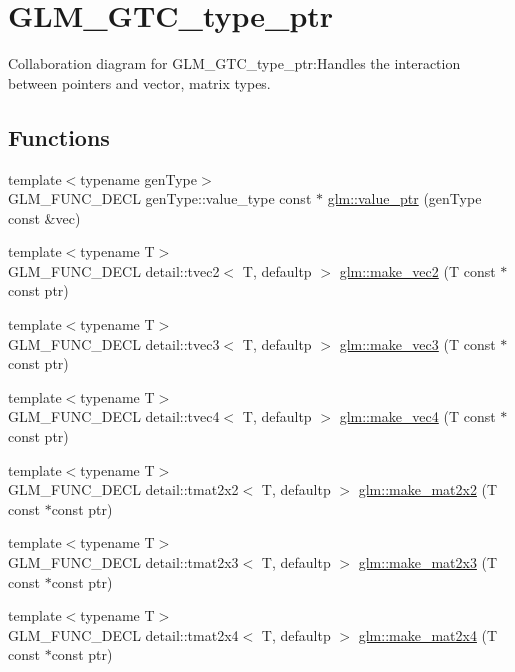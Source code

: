 \hypertarget{group__gtc__type__ptr}{
\section{GLM\_\-GTC\_\-type\_\-ptr}
\label{group__gtc__type__ptr}
}


Collaboration diagram for GLM\_\-GTC\_\-type\_\-ptr:Handles the interaction between pointers and vector, matrix types.  
\subsection*{Functions}
\begin{CompactItemize}
\item 
{\footnotesize template$<$typename genType$>$ }\\GLM\_\-FUNC\_\-DECL genType::value\_\-type const $\ast$ \hyperlink{group__gtc__type__ptr_g87d5cb613f75f83973609ccb8922200b}{glm::value\_\-ptr} (genType const \&vec)
\item 
{\footnotesize template$<$typename T$>$ }\\GLM\_\-FUNC\_\-DECL detail::tvec2$<$ T, defaultp $>$ \hyperlink{group__gtc__type__ptr_g7009d8090f046d1ce98e59df584fff46}{glm::make\_\-vec2} (T const $\ast$const ptr)
\item 
{\footnotesize template$<$typename T$>$ }\\GLM\_\-FUNC\_\-DECL detail::tvec3$<$ T, defaultp $>$ \hyperlink{group__gtc__type__ptr_g0b727d0acba617ec7b9af9f06892336a}{glm::make\_\-vec3} (T const $\ast$const ptr)
\item 
{\footnotesize template$<$typename T$>$ }\\GLM\_\-FUNC\_\-DECL detail::tvec4$<$ T, defaultp $>$ \hyperlink{group__gtc__type__ptr_gf44d3c8aa09a7a8021ae5312e2f1f091}{glm::make\_\-vec4} (T const $\ast$const ptr)
\item 
{\footnotesize template$<$typename T$>$ }\\GLM\_\-FUNC\_\-DECL detail::tmat2x2$<$ T, defaultp $>$ \hyperlink{group__gtc__type__ptr_g49c18920c113e1e72caea1c3978c8e7f}{glm::make\_\-mat2x2} (T const $\ast$const ptr)
\item 
{\footnotesize template$<$typename T$>$ }\\GLM\_\-FUNC\_\-DECL detail::tmat2x3$<$ T, defaultp $>$ \hyperlink{group__gtc__type__ptr_g86620b90c993ff8e31f0dff1611bd2da}{glm::make\_\-mat2x3} (T const $\ast$const ptr)
\item 
{\footnotesize template$<$typename T$>$ }\\GLM\_\-FUNC\_\-DECL detail::tmat2x4$<$ T, defaultp $>$ \hyperlink{group__gtc__type__ptr_g50245f47c0e6f5a2ab5ce157dc3e97ac}{glm::make\_\-mat2x4} (T const $\ast$const ptr)

\end{CompactItemize}
